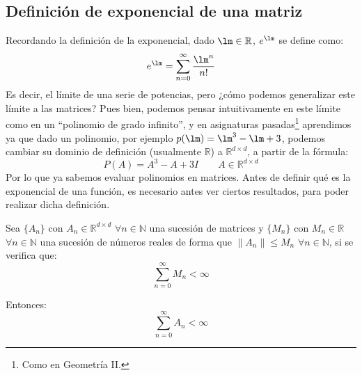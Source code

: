 \subsection{Definición de exponencial de una matriz}
Recordando la definición de la exponencial, dado $\lm \in \mathbb{R}$, $e^\lm$ se define como:
\begin{equation*}
    e^\lm = \sum_{n=0}^{\infty}\dfrac{\lm^n}{n!}
\end{equation*}
Es decir, el límite de una serie de potencias, pero ¿cómo podemos generalizar este límite a las matrices? Pues bien, podemos pensar intuitivamente en este límite como en un ``polinomio de grado infinito'', y en asignaturas pasadas\footnote{Como en Geometría II.} aprendimos ya que dado un polinomio, por ejemplo $p(\lm)=\lm^3 - \lm + 3$, podemos cambiar su dominio de definición (usualmente $\mathbb{R}$) a $\mathbb{R}^{d\times d}$, a partir de la fórmula:
\begin{equation*}
    P(A) = A^3 - A + 3I \qquad A\in \mathbb{R}^{d\times d}
\end{equation*}
Por lo que ya sabemos evaluar polinomios en matrices. Antes de definir qué es la exponencial de una función, es necesario antes ver ciertos resultados, para poder realizar dicha definición.

\begin{lema}\label{lema:1_exp}
    Sea $\{A_n\}$ con $A_n\in \mathbb{R}^{d\times d}$ $\forall n\in \mathbb{N}$ una sucesión de matrices y $\{M_n\}$ con $M_n\in \mathbb{R}$ $\forall n\in \mathbb{N}$ una sucesión de números reales de forma que $\|A_n\|\leq M_n$ $\forall n\in \mathbb{N}$, si se verifica que:
    \begin{equation*}
        \sum_{n=0}^{\infty}M_n < \infty
    \end{equation*}

    Entonces:
    \begin{equation*}
        \sum_{n=0}^{\infty}A_n < \infty
    \end{equation*}
\end{lema}

